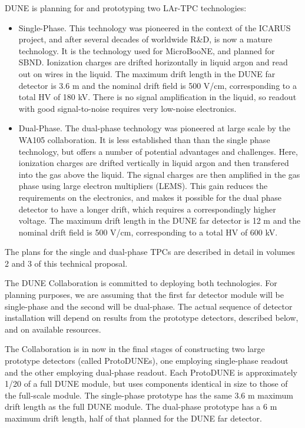 DUNE is planning for and prototyping two LAr-TPC technologies:
\begin{itemize}
\item Single-Phase. This technology was pioneered in the context of the ICARUS project, and after several decades of worldwide R\&D, is now a mature technology. It is the technology used for MicroBooNE, and planned for SBND. Ionization charges are drifted horizontally in liquid argon and read out on wires in the liquid. The maximum drift length in the DUNE far detector is 3.6 m and the nominal drift field is 500 V/cm, corresponding to a total HV of 180 kV. There is no signal amplification in the liquid, so readout with good signal-to-noise requires very low-noise electronics.

\item Dual-Phase. The dual-phase technology was pioneered at large scale by the WA105 collaboration. It is less established than than the single phase technology, but offers a number of potential advantages and challenges. Here, ionization charges are drifted vertically in liquid argon and then transfered into the gas above the liquid. The signal charges are then amplified in the gas phase using large electron multipliers (LEMS). This gain reduces the requirements on the electronics, and makes it possible for the dual phase detector to have a longer drift, which requires a correspondingly higher voltage.
The maximum drift length in the DUNE far detector is 12 m and the nominal drift field is 500 V/cm, corresponding to a total HV of 600 kV. 

\end{itemize}
The plans for the single and dual-phase TPCs are described in detail in volumes 2 and 3 of this technical proposal.

The DUNE Collaboration is committed to deploying both technologies. 
For planning purposes, we are assuming that the first far detector module will be
single-phase and the second will be dual-phase.
The actual sequence of detector installation will depend on results from the prototype detectors, described below, and on available resources.


The Collaboration is in now in the final stages of constructing two large prototype detectors (called ProtoDUNEs), one employing single-phase readout and the other employing dual-phase readout. Each ProtoDUNE is approximately 1/20 of a full DUNE module, but uses components identical in size to those of the full-scale module. The single-phase prototype has the same 3.6 m maximum drift length as the full DUNE module. The dual-phase prototype has a 6 m maximum drift length, half of that planned for the DUNE far detector. 

